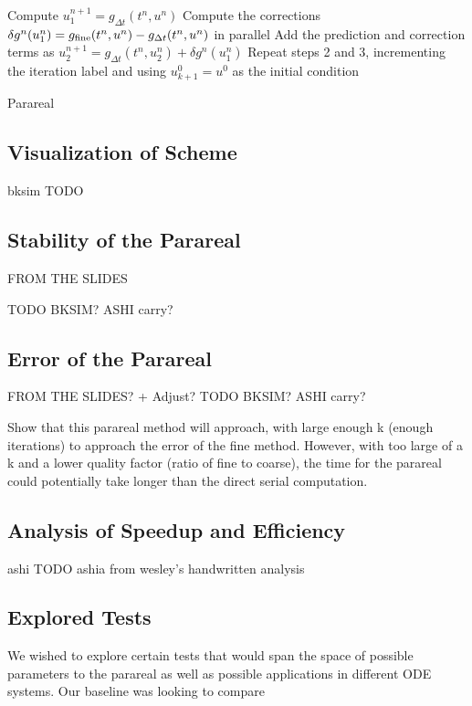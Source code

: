 \documentclass[letterpaper,twocolumn,11pt]{article}
\begin{document}
\begin{algorithm}[t]
    Compute $u_1^{n+1} = g_{\Delta t}(t^n, u^n)$\;
    Compute the corrections $\delta g^n(u_1^n) = g_{\textnormal{fine}}(t^n,
    u^n) - g_{\Delta t}(t^n, u^n)$ in parallel\;
    Add the prediction and correction terms as $u_2^{n+1} = g_{\Delta
    t}(t^n, u_2^n) + \delta g^n(u_1^n)$\;
    Repeat steps 2 and 3, incrementing the iteration label and using $u_{k+1}^0
    = u^0$ as the initial condition\
 \caption{Parareal}
 \label{alg:parareal}
\end{algorithm}

\subsection{Visualization of Scheme}
bksim TODO

\subsection{Stability of the Parareal}

FROM THE SLIDES 

TODO BKSIM? ASHI carry?

\subsection{Error of the Parareal}

FROM THE SLIDES? + Adjust?
TODO BKSIM? ASHI carry?

Show that this parareal method will approach, with large enough k (enough iterations) to approach the error of the fine method.  However, with too large of a k and a lower quality factor (ratio of fine to coarse), the time for the parareal could potentially take longer than the direct serial computation.

\subsection{Analysis of Speedup and Efficiency}

ashi TODO ashia from wesley's handwritten analysis

\subsection{Explored Tests}
We wished to explore certain tests that would span the space of possible parameters to the parareal as well as possible applications in different ODE systems.  Our baseline was looking to compare 
\end{document}
